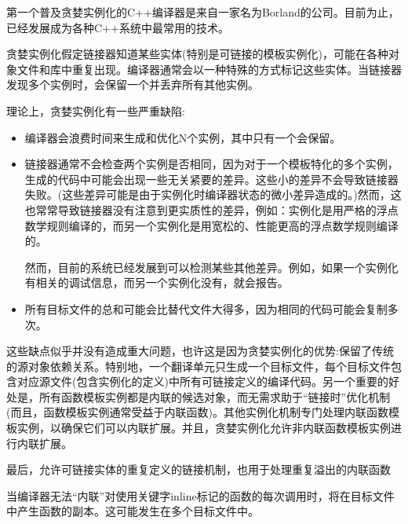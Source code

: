 
第一个普及贪婪实例化的C++编译器是来自一家名为Borland的公司。目前为止，已经发展成为各种C++系统中最常用的技术。

贪婪实例化假定链接器知道某些实体(特别是可链接的模板实例化)，可能在各种对象文件和库中重复出现。编译器通常会以一种特殊的方式标记这些实体。当链接器发现多个实例时，会保留一个并丢弃所有其他实例。

理论上，贪婪实例化有一些严重缺陷:

\begin{itemize}
\item 
编译器会浪费时间来生成和优化N个实例，其中只有一个会保留。

\item 
链接器通常不会检查两个实例是否相同，因为对于一个模板特化的多个实例，生成的代码中可能会出现一些无关紧要的差异。这些小的差异不会导致链接器失败。(这些差异可能是由于实例化时编译器状态的微小差异造成的。)然而，这也常常导致链接器没有注意到更实质性的差异，例如：实例化是用严格的浮点数学规则编译的，而另一个实例化是用宽松的、性能更高的浮点数学规则编译的。

\begin{tcolorbox}[colback=webgreen!5!white,colframe=webgreen!75!black]
\hspace*{0.75cm}然而，目前的系统已经发展到可以检测某些其他差异。例如，如果一个实例化有相关的调试信息，而另一个实例化没有，就会报告。
\end{tcolorbox}

\item 
所有目标文件的总和可能会比替代文件大得多，因为相同的代码可能会复制多次。
\end{itemize}

这些缺点似乎并没有造成重大问题，也许这是因为贪婪实例化的优势:保留了传统的源对象依赖关系。特别地，一个翻译单元只生成一个目标文件，每个目标文件包含对应源文件(包含实例化的定义)中所有可链接定义的编译代码。另一个重要的好处是，所有函数模板实例都是内联的候选对象，而无需求助于“链接时”优化机制(而且，函数模板实例通常受益于内联函数)。其他实例化机制专门处理内联函数模板实例，以确保它们可以内联扩展。并且，贪婪实例化允许非内联函数模板实例进行内联扩展。

最后，允许可链接实体的重复定义的链接机制，也用于处理重复溢出的内联函数

\begin{tcolorbox}[colback=webgreen!5!white,colframe=webgreen!75!black]
\hspace*{0.75cm}当编译器无法“内联”对使用关键字inline标记的函数的每次调用时，将在目标文件中产生函数的副本。这可能发生在多个目标文件中。
\end{tcolorbox}

